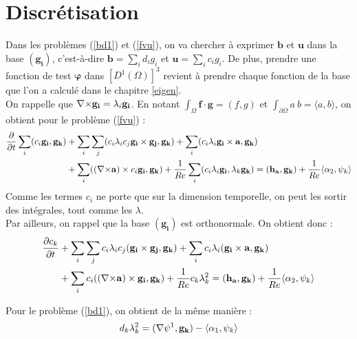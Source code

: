 \section{Discrétisation}
\label{discr}

Dans les problèmes (\ref{bd1}) et (\ref{fvu}), on va chercher à exprimer $\mathbf{b}$ et $\mathbf{u}$ dans la base $(\mathbf{g_i})$, c'est-à-dire $\mathbf{b}=\sum_i d_ig_i$ et $\mathbf{u}=\sum_i c_ig_i$. De plus, prendre une fonction de test $\bm{\varphi}$ dans $[D^1(\Omega)]^3$ revient à prendre chaque fonction de la base que l'on a calculé dans le chapitre \ref{eigen}.\\
On rappelle que ${\nabla\times} \mathbf{g_i}=\lambda_i\mathbf{g_i}$. En notant $\int_\Omega \mathbf{f}\cdot\mathbf{g}=(f,g)$ et $\int_{\partial\Omega}a\ b=\langle a,b\rangle$, on obtient pour le problème (\ref{fvu}) :
\begin{align*}
\frac{\partial}{\partial t}\sum_i (c_i\mathbf{g_i}, \mathbf{g_k}) &+ \sum_i\sum_j (c_i\lambda_ic_j\mathbf{g_i}\times \mathbf{g_j},\mathbf{g_k}) + \sum_i(c_i\lambda_i\mathbf{g_i}\times \mathbf{a},\mathbf{g_k})\\
&+ \sum_i (({\nabla\times} \mathbf{a})\times c_i\mathbf{g_i},\mathbf{g_k}) + \frac{1}{Re}\sum_i(c_i\lambda_i\mathbf{g_i}, \lambda_k\mathbf{g_k}) = (\mathbf{h_a},\mathbf{g_k}) + \frac{1}{Re}\langle\alpha_2,\psi_k\rangle
\end{align*}
Comme les termes $c_i$ ne porte que sur la dimension temporelle, on peut les
sortir des intégrales, tout comme les $\lambda$.\\

Par ailleurs, on rappel que la base $(\mathbf{g_i})$ est orthonormale. On obtient donc :
\begin{equation}\label{fvspec}
\begin{aligned}
\frac{\partial c_k}{\partial t} &+ \sum_i\sum_j c_i\lambda_i c_j(\mathbf{g_i}\times \mathbf{g_j}, \mathbf{g_k}) + \sum_i c_i\lambda_i(\mathbf{g_i}\times \mathbf{a},\mathbf{g_k})\\
&+ \sum_i c_i(({\nabla\times} \mathbf{a})\times \mathbf{g_i}, \mathbf{g_k}) + \frac{1}{Re}c_k\lambda_k^2 = (\mathbf{h_a},\mathbf{g_k}) + \frac{1}{Re}\langle\alpha_2,\psi_k\rangle
\end{aligned}
\end{equation}

Pour le problème (\ref{bd1}), on obtient de la même manière :
\begin{equation}\label{discbd1}
d_k\lambda_k^2 = ({\nabla}\psi^1,\mathbf{g_k}) - \langle\alpha_1,\psi_k\rangle
\end{equation}

